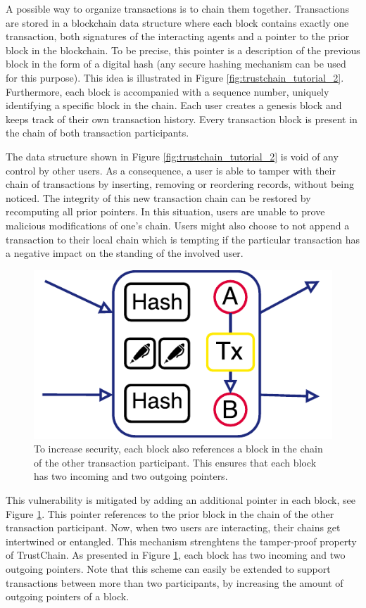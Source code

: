 \documentclass[USenglish]{article}
\begin{document}
A possible way to organize transactions is to chain them together.
Transactions are stored in a blockchain data structure where each block contains exactly one transaction, both signatures of the interacting agents and a pointer to the prior block in the blockchain.
To be precise, this pointer is a description of the previous block in the form of a digital hash (any secure hashing mechanism can be used for this purpose).
This idea is illustrated in Figure \ref{fig:trustchain_tutorial_2}.
Furthermore, each block is accompanied with a sequence number, uniquely identifying a specific block in the chain.
Each user creates a genesis block and keeps track of their own transaction history.
Every transaction block is present in the chain of both transaction participants.

The data structure shown in Figure \ref{fig:trustchain_tutorial_2} is void of any control by other users. As a consequence, a user is able to tamper with their chain of transactions by inserting, removing or reordering records, without being noticed.
The integrity of this new transaction chain can be restored by recomputing all prior pointers.
In this situation, users are unable to prove malicious modifications of one's chain.
Users might also choose to not append a transaction to their local chain which is tempting if the particular transaction has a negative impact on the standing of the involved user.

\begin{figure}[h!]
	\centering
	\includegraphics[width=0.5\columnwidth]{assets/trustchain_tutorial_3}
	\caption{To increase security, each block also references a block in the chain of the other transaction participant. This ensures that each block has two incoming and two outgoing pointers.}
	\label{fig:trustchain_tutorial_3}
\end{figure}

This vulnerability is mitigated by adding an additional pointer in each block, see Figure \ref{fig:trustchain_tutorial_3}.
This pointer references to the prior block in the chain of the other transaction participant.
Now, when two users are interacting, their chains get intertwined or entangled.
This mechanism strenghtens the tamper-proof property of TrustChain.
As presented in Figure \ref{fig:trustchain_tutorial_3}, each block has two incoming and two outgoing pointers.
Note that this scheme can easily be extended to support transactions between more than two participants, by increasing the amount of outgoing pointers of a block.
\end{document}
